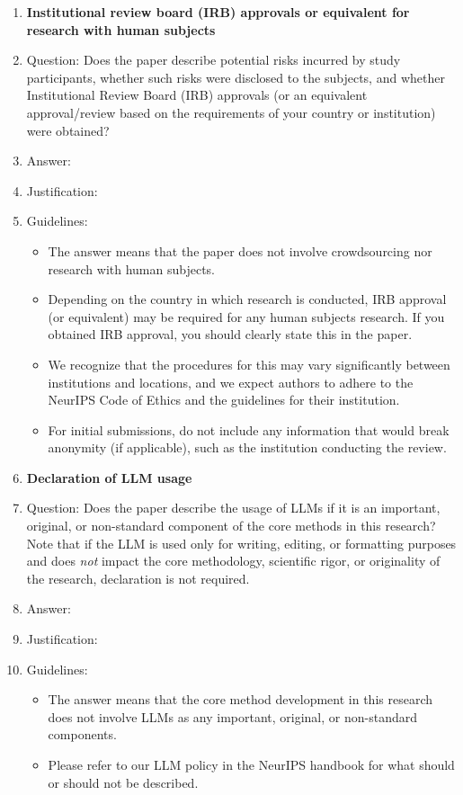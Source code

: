 \documentclass{article}
\begin{document}
\begin{enumerate}
\item {\bf Institutional review board (IRB) approvals or equivalent for research with human subjects}
    \item[] Question: Does the paper describe potential risks incurred by study participants, whether such risks were disclosed to the subjects, and whether Institutional Review Board (IRB) approvals (or an equivalent approval/review based on the requirements of your country or institution) were obtained?
    \item[] Answer: \answerTODO{} %
    \item[] Justification: \justificationTODO{}
    \item[] Guidelines:
    \begin{itemize}
        \item The answer \answerNA{} means that the paper does not involve crowdsourcing nor research with human subjects.
        \item Depending on the country in which research is conducted, IRB approval (or equivalent) may be required for any human subjects research. If you obtained IRB approval, you should clearly state this in the paper. 
        \item We recognize that the procedures for this may vary significantly between institutions and locations, and we expect authors to adhere to the NeurIPS Code of Ethics and the guidelines for their institution. 
        \item For initial submissions, do not include any information that would break anonymity (if applicable), such as the institution conducting the review.
    \end{itemize}

\item {\bf Declaration of LLM usage}
    \item[] Question: Does the paper describe the usage of LLMs if it is an important, original, or non-standard component of the core methods in this research? Note that if the LLM is used only for writing, editing, or formatting purposes and does \emph{not} impact the core methodology, scientific rigor, or originality of the research, declaration is not required.
    \item[] Answer: \answerTODO{} %
    \item[] Justification: \justificationTODO{}
    \item[] Guidelines:
    \begin{itemize}
        \item The answer \answerNA{} means that the core method development in this research does not involve LLMs as any important, original, or non-standard components.
        \item Please refer to our LLM policy in the NeurIPS handbook for what should or should not be described.
    \end{itemize}

\end{enumerate} \fi
\end{document}

